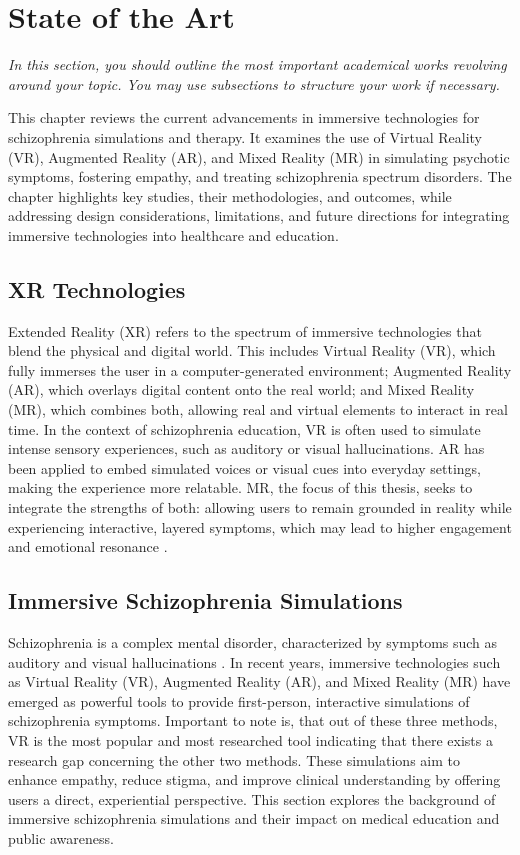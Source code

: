 \chapter{State of the Art}
\label{ch:background}

\emph{In this section, you should outline the most important academical works revolving around your topic. You may use subsections to structure your work if necessary.}

This chapter reviews the current advancements in immersive technologies for schizophrenia simulations and therapy. It examines the use of Virtual Reality (VR), Augmented Reality (AR), and Mixed Reality (MR) in simulating psychotic symptoms, fostering empathy, and treating schizophrenia spectrum disorders. The chapter highlights key studies, their methodologies, and outcomes, while addressing design considerations, limitations, and future directions for integrating immersive technologies into healthcare and education.

\section{XR Technologies}
Extended Reality (XR) refers to the spectrum of immersive technologies that blend the physical and digital world. This includes Virtual Reality (VR), which fully immerses the user in a computer-generated environment; Augmented Reality (AR), which overlays digital content onto the real world; and Mixed Reality (MR), which combines both, allowing real and virtual elements to interact in real time. In the context of schizophrenia education, VR is often used to simulate intense sensory experiences, such as auditory or visual hallucinations. AR has been applied to embed simulated voices or visual cues into everyday settings, making the experience more relatable. MR, the focus of this thesis, seeks to integrate the strengths of both: allowing users to remain grounded in reality while experiencing interactive, layered symptoms, which may lead to higher engagement and emotional resonance \cite{Krogmeier2024, Silva2017, Zare-Bidaki2022}.

\section{Immersive Schizophrenia Simulations}
Schizophrenia is a complex mental disorder, characterized by symptoms such as auditory and visual hallucinations \cite{Silverstein2021}. In recent years, immersive technologies such as Virtual Reality (VR), Augmented Reality (AR), and Mixed Reality (MR) have emerged as powerful tools to provide first-person, interactive simulations of schizophrenia symptoms. Important to note is, that out of these three methods, VR is the most popular and most researched tool \cite{Kuhail2022} indicating that there exists a research gap concerning the other two methods. These simulations aim to enhance empathy, reduce stigma, and improve clinical understanding by offering users a direct, experiential perspective. This section explores the background of immersive schizophrenia simulations and their impact on medical education and public awareness.

